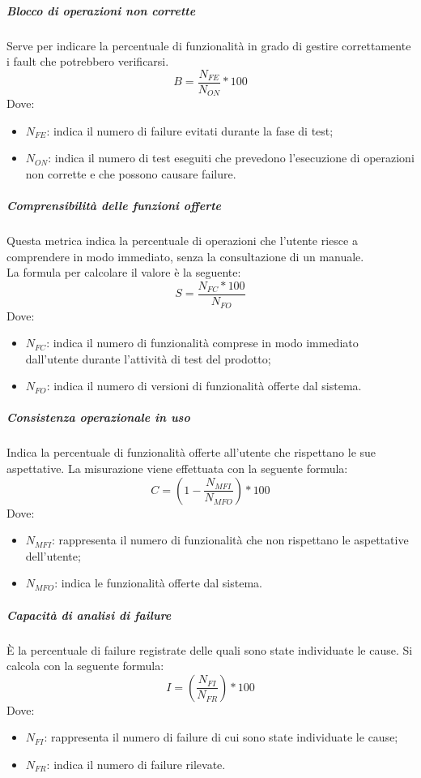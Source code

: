\documentclass[../NormeDiProgetto_v3.0.0.tex]{subfiles}
\begin{document}
			\subparagraph{Blocco di operazioni non corrette}
				Serve per indicare la percentuale di funzionalità in grado di gestire correttamente i fault che potrebbero verificarsi.
				\begin{equation*}
					B = \frac{N_{FE}}{N_{ON}} * 100
				\end{equation*}
				Dove:
				\begin{itemize}
					\item \textbf{$N_{FE}$}: indica il numero di failure evitati durante la fase di test;
					\item \textbf{$N_{ON}$}: indica il numero di test eseguiti che prevedono l'esecuzione di operazioni non corrette e che possono causare failure.
				\end{itemize}

			\subparagraph{Comprensibilità delle funzioni offerte}
				Questa metrica indica la percentuale di operazioni che l'utente riesce a comprendere in modo immediato, senza la consultazione di un manuale.\\La formula per calcolare il valore è la seguente:
				\begin{equation*}
					S = \frac{N_{FC} * 100}{N_{FO}}
				\end{equation*}
				Dove:
				\begin{itemize}
					\item \textbf{$N_{FC}$}: indica il numero di funzionalità comprese in modo immediato dall'utente durante l'attività di test del prodotto;
					\item \textbf{$N_{FO}$}: indica il numero di versioni di funzionalità offerte dal sistema.
				\end{itemize}
				
	
			\subparagraph{Consistenza operazionale in uso}
				Indica la percentuale di funzionalità offerte all'utente che rispettano le sue aspettative. La misurazione viene effettuata con la seguente formula:
				\begin{equation*}
					C = (1 - \frac{N_{MFI}}{N_{MFO}}) * 100
				\end{equation*}
				Dove:
				\begin{itemize}
					\item \textbf{$N_{MFI}$}:  rappresenta il numero di funzionalità che non rispettano le aspettative dell'utente;
					\item \textbf{$	N_{MFO}$}:  indica le funzionalità offerte dal sistema.
				\end{itemize}
			
			\subparagraph{Capacità di analisi di failure}
				È la percentuale di failure registrate delle quali sono state individuate le cause. Si calcola con la seguente formula:
					\begin{equation*}
						I = (\frac{N_{FI}}{N_{FR}}) * 100
					\end{equation*}
					Dove:
					\begin{itemize}
						\item \textbf{$	N_{FI}$}: rappresenta il numero di failure di cui sono state individuate le cause;
						\item \textbf{$N_{FR}$}: indica il numero di failure rilevate.
					\end{itemize}
\end{document}
